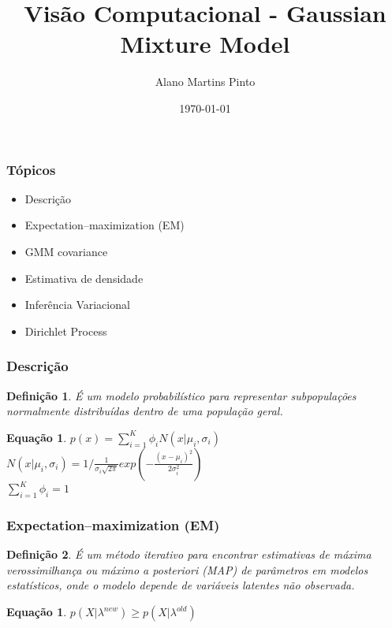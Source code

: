 \documentclass[aspectratio=169]{beamer}
\title[\sc{Visão computacional}]{Visão Computacional - Gaussian Mixture Model}
\author[Alano Martins Pinto]{Alano Martins Pinto}
\institute{UECE - Universidade Estadual do Ceará} %
\date{\today}
\theoremstyle{Definition}
\newtheorem{defn}{Defini\c c\~ao}
\newtheorem{eq}[theorem]{Equa\c c\~ao}
\begin{document}
\begin{frame}
	\titlepage
\end{frame}


\begin{frame}
	\frametitle{Tópicos}
	\begin{itemize}
		\item Descrição
		\item Expectation–maximization (EM)
		\item GMM covariance
		\item Estimativa de densidade
		\item Inferência Variacional
		\item Dirichlet Process

	\end{itemize}

\end{frame}

\begin{frame}
	\frametitle{Descrição}
	
	\begin{defn}
		É um modelo probabilístico para representar subpopulações normalmente distribuídas dentro de uma população geral.
	\end{defn}
	
	\begin{eq}
			$ p(x) = \sum_{i=1}^{K} \phi_i N(x \vert \mu_i, \sigma_i) $ \\
			$ N(x \vert \mu_i, \sigma_i) = 1 / { \frac{1}{\sigma_i \sqrt{2\pi}}} exp(- \frac{(x - \mu_i)^2}{2\sigma_i^2}) $ \\
			$ \sum_{i=1}^{K} \phi_i = 1 $
	\end{eq}
	
	
\end{frame}

\begin{frame}
	\frametitle{Expectation–maximization (EM)}
	
	\begin{defn}
		É um método iterativo para encontrar estimativas de máxima verossimilhança ou máximo a posteriori (MAP) de parâmetros em modelos estatísticos, onde o modelo depende de variáveis latentes não observada.
	\end{defn}
	
	\begin{eq}
			$ p(X \vert \lambda^{new}) \geq p(X \vert \lambda^{old}) $ 
	\end{eq}
	
	
\end{frame}
\end{document}
